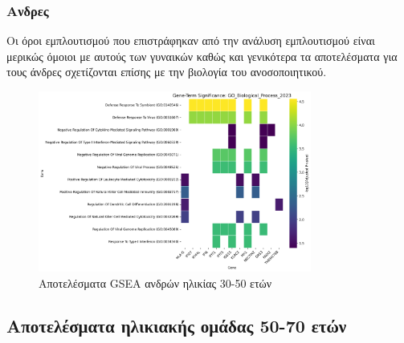 \documentclass[12pt]{report}
\begin{document}
            \subsubsection{Ανδρες}
                \par
                    Οι όροι εμπλουτισμού που επιστράφηκαν από την ανάλυση εμπλουτισμού είναι μερικώς όμοιοι με αυτούς των γυναικών καθώς και γενικότερα τα αποτελέσματα για τους άνδρες σχετίζονται επίσης με την βιολογία του ανοσοποιητικού.
                \begin{figure}[H]
                    \centering
                    \includegraphics[width=0.8\textwidth]{GSEA/Males/30-50/gsea_results_Male_30-50_GO_Biological_Process_2023_heatmap.png}
                    \caption{Αποτελέσματα GSEA ανδρών ηλικίας 30-50 ετών}
                    \label{fig:gsea_results_Male_30-50_GO_Biological_Process_2023_heatmap}
                \end{figure}
            \newpage
        \subsection{Αποτελέσματα ηλικιακής ομάδας 50-70 ετών}
\end{document}
